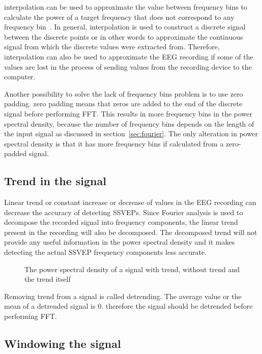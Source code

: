 \Gls{interpolation} can be used to approximate the value between \glspl{frequency bin} to calculate the power of a \gls{target} frequency that does not correspond to any \gls{frequency bin}~\cite{cca_psda}. In general, \gls{interpolation} is used to construct a discrete signal between the discrete points or in other words to approximate the continuous signal from which the discrete values were extracted from. Therefore, \gls{interpolation} can also be used to approximate the \gls{EEG} recording if some of the values are lost in the process of sending values from the recording device to the computer.

Another possibility to solve the lack of \glspl{frequency bin} problem is to use \gls{zero padding}. \Gls{zero padding} means that zeros are added to the end of the discrete signal before performing \gls{FFT}. This results in more \glspl{frequency bin} in the \gls{power spectral density}, because the number of \glspl{frequency bin} depends on the length of the input signal as discussed in section~\ref{sec:fourier}. The only alteration in \gls{power spectral density} is that it has more \glspl{frequency bin} if calculated from a zero-padded signal.

\subsection{Trend in the signal}

Linear trend or constant increase or decrease of values in the \gls{EEG} recording can decrease the accuracy of detecting \glspl{SSVEP}. Since Fourier analysis is used to decompose the recorded signal into \glspl{frequency component}, the linear trend present in the recording will also be decomposed. The decomposed trend will not provide any useful information in the \gls{power spectral density} and it makes detecting the actual \gls{SSVEP} \glspl{frequency component} less accurate.

\begin{figure}
	
	\caption{The power spectral density of a signal with trend, without trend and the trend itself}
\end{figure}

Removing trend from a signal is called detrending. The average value or the mean of a detrended signal is 0. therefore the signal should be detrended before performing \gls{FFT}.

\subsection{Windowing the signal}

